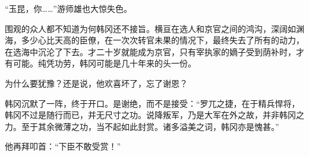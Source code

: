 “玉昆，你……”游师雄也大惊失色。

围观的众人都不知道为何韩冈还不接旨。横亘在选人和京官之间的鸿沟，深阔如渊海，多少心比天高的臣僚，在一次次转官未果的情况下，最终失去了所有的动力，在选海中沉沦了下去。才二十岁就能成为京官，只有宰执家的嫡子受到荫补时，才有可能。纯凭功劳，韩冈可能是几十年来的头一份。

为什么要犹豫？还是说，他欢喜坏了，忘了谢恩？

韩冈沉默了一阵，终于开口。是谢绝，而不是接受：“罗兀之捷，在于精兵悍将，韩冈不过是随行而已，并无尺寸之功。说降叛军，乃是大军在外之故，并非韩冈之力。至于其余微薄之功，当不起如此封赏。诸多溢美之词，韩冈亦是愧甚。”

他再拜叩首：“下臣不敢受赏！”


